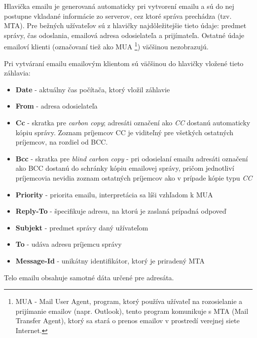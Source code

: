 \documentclass[slovak,master,public,dept460,male,cpdeclaration,oneside]{diploma}
\begin{document}
Hlavička emailu je generovaná automaticky pri vytvorení emailu a sú do nej postupne vkladané informácie zo serverov, cez ktoré správa prechádza (tzv. MTA). Pre bežných užívateľov sú z hlavičky najdôležitejšie tieto údaje: predmet správy, čas odoslania, emailová adresa odosielateľa a prijímateľa. Ostatné údaje emailoví klienti (označovaní tiež ako MUA \footnote{MUA - Mail User Agent, program, ktorý používa užívateľ na rozosielanie a prijímanie emailov (napr. Outlook), tento program komunikuje s MTA (Mail Transfer Agent), ktorý sa stará o prenos emailov v prostredí verejnej siete Internet.}) väčšinou nezobrazujú.


Pri vytváraní emailu emailovým klientom sú väčšinou do hlavičky vložené tieto záhlavia:

\begin{itemize}
\item \textbf{Date} - aktuálny čas počítača, ktorý vložil záhlavie

\item \textbf{From} - adresa odosielateľa

\item \textbf{Cc} - skratka pre \textit{carbon copy}; adresáti označení ako \textit{CC} dostanú automaticky kópiu správy. Zoznam príjemcov CC je viditeľný pre všetkých ostatných príjemcov, na rozdiel od BCC.


\item \textbf{Bcc} - skratka pre \textit{blind carbon copy} - pri odosielaní emailu adresáti označení ako BCC dostanú do schránky kópiu emailovej správy, pričom jednotliví príjemcovia nevidia zoznam ostatných príjemcov ako v prípade kópie typu \textit{CC}

\item \textbf{Priority} - priorita emailu, interpretácia sa líši vzhľadom k MUA

\item \textbf{Reply-To} - špecifikuje adresu, na ktorú je zaslaná prípadná odpoveď

\item \textbf{Subjekt} - predmet správy daný užívateľom

\item \textbf{To} - udáva adresu príjemcu správy

\item \textbf{Message-Id} - unikátny identifikátor, ktorý je priradený MTA
\end{itemize}

Telo emailu obsahuje samotné dáta určené pre adresáta. 
\end{document}
